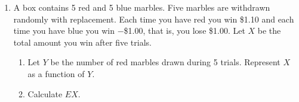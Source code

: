 \documentclass[12pt]{article}%
\newcommand{\0}{{\bf 0}}
\begin{document}
\begin{enumerate}
\item %
A box contains 5 red and 5 blue marbles. 
Five marbles are withdrawn randomly with replacement. 
Each time you have red you win \$1.10 and
each time you have blue you win $-$\$1.00,
that is, you lose \$1.00. 
Let $X$ be the total amount you win after five trials.
\begin{enumerate}
\item
Let $Y$ be the number of red marbles drawn during 5 trials.
Represent $X$ as a function of $Y$.  

\item
Calculate  $EX$. 
\end{enumerate}


\end{enumerate}
\end{document}
